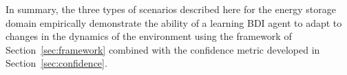 %

\medskip
In summary, the three types of scenarios described here for the energy storage domain empirically demonstrate the ability of a learning BDI agent to adapt to changes in the dynamics of the environment using the framework of Section~\ref{sec:framework} combined with the confidence metric developed in Section~\ref{sec:confidence}.  



 

